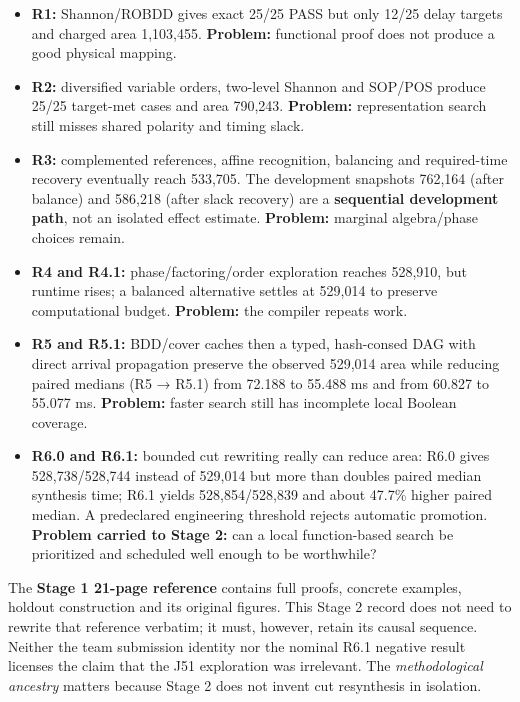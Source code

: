 \documentclass[a4paper,10pt]{article}
\providecommand{\tightlist}{\setlength{\itemsep}{0pt}\setlength{\parskip}{0pt}}
\theoremstyle{definition}
\theoremstyle{remark}
\begin{document}
\begin{itemize}
\tightlist
\item
  \textbf{R1:} Shannon/ROBDD gives exact 25/25 PASS but only 12/25 delay targets and charged area 1,103,455. \textbf{Problem:} functional proof does not produce a good physical mapping.
\item
  \textbf{R2:} diversified variable orders, two-level Shannon and SOP/POS produce 25/25 target-met cases and area 790,243. \textbf{Problem:} representation search still misses shared polarity and timing slack.
\item
  \textbf{R3:} complemented references, affine recognition, balancing and required-time recovery eventually reach 533,705. The development snapshots 762,164 (after balance) and 586,218 (after slack recovery) are a \textbf{sequential development path}, not an isolated effect estimate. \textbf{Problem:} marginal algebra/phase choices remain.
\item
  \textbf{R4 and R4.1:} phase/factoring/order exploration reaches 528,910, but runtime rises; a balanced alternative settles at 529,014 to preserve computational budget. \textbf{Problem:} the compiler repeats work.
\item
  \textbf{R5 and R5.1:} BDD/cover caches then a typed, hash-consed DAG with direct arrival propagation preserve the observed 529,014 area while reducing paired medians (R5 → R5.1) from 72.188 to 55.488 ms and from 60.827 to 55.077 ms. \textbf{Problem:} faster search still has incomplete local Boolean coverage.
\item
  \textbf{R6.0 and R6.1:} bounded cut rewriting really can reduce area: R6.0 gives 528,738/528,744 instead of 529,014 but more than doubles paired median synthesis time; R6.1 yields 528,854/528,839 and about 47.7\% higher paired median. A predeclared engineering threshold rejects automatic promotion. \textbf{Problem carried to Stage 2:} can a local function-based search be prioritized and scheduled well enough to be worthwhile?
\end{itemize}

The \textbf{Stage 1 21-page reference} contains full proofs, concrete examples, holdout construction and its original figures. This Stage 2 record does not need to rewrite that reference verbatim; it must, however, retain its causal sequence. Neither the team submission identity nor the nominal R6.1 negative result licenses the claim that the J51 exploration was irrelevant. The \emph{methodological ancestry} matters because Stage 2 does not invent cut resynthesis in isolation.
\end{document}
